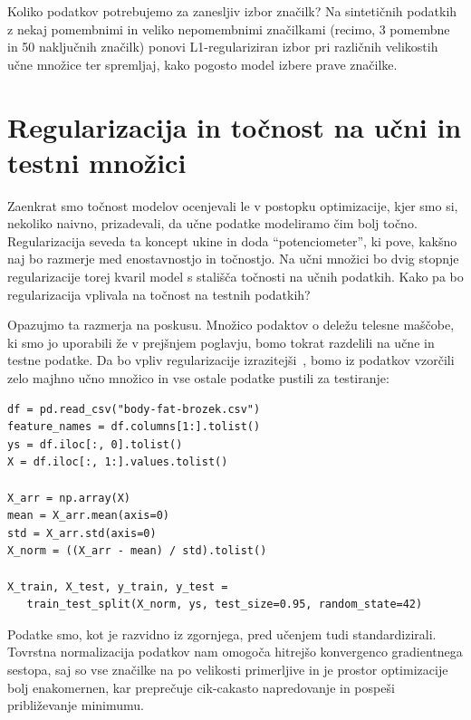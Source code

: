 \begin{exercise}{Koliko podatkov potrebujemo za zanesljiv izbor značilk?}
Na sintetičnih podatkih z nekaj pomembnimi in veliko nepomembnimi značilkami (recimo, 3 pomembne in 50 naključnih značilk) ponovi L1-regulariziran izbor pri različnih velikostih učne množice ter spremljaj, kako pogosto model izbere prave značilke.
\end{exercise}



\section{Regularizacija in točnost na učni in testni množici}

Zaenkrat smo točnost modelov ocenjevali le v postopku optimizacije, kjer smo si, nekoliko naivno, prizadevali, da učne podatke modeliramo čim bolj točno. Regularizacija seveda ta koncept ukine in doda ``potenciometer'', ki pove, kakšno naj bo razmerje med enostavnostjo in točnostjo. Na učni množici bo dvig stopnje regularizacije torej kvaril model s stališča točnosti na učnih podatkih. Kako pa bo regularizacija vplivala na točnost na testnih podatkih?

Opazujmo ta razmerja na poskusu. Množico podaktov o deležu telesne maščobe, ki smo jo uporabili že v prejšnjem poglavju, bomo tokrat razdelili na učne in testne podatke. Da bo vpliv regularizacije izrazitejši~, bomo iz podatkov vzorčili zelo majhno učno množico in vse ostale podatke pustili za testiranje:

\vspace*{3mm}
\begin{lstlisting}
df = pd.read_csv("body-fat-brozek.csv")
feature_names = df.columns[1:].tolist()
ys = df.iloc[:, 0].tolist()
X = df.iloc[:, 1:].values.tolist()

X_arr = np.array(X)
mean = X_arr.mean(axis=0)
std = X_arr.std(axis=0)
X_norm = ((X_arr - mean) / std).tolist()

X_train, X_test, y_train, y_test = 
   train_test_split(X_norm, ys, test_size=0.95, random_state=42)
\end{lstlisting}

Podatke smo, kot je razvidno iz zgornjega, pred učenjem tudi standardizirali. Tovrstna normalizacija podatkov nam omogoča hitrejšo konvergenco gradientnega sestopa, saj so vse značilke na po velikosti primerljive in je prostor optimizacije bolj enakomernen, kar preprečuje cik-cakasto napredovanje in pospeši približevanje minimumu.


